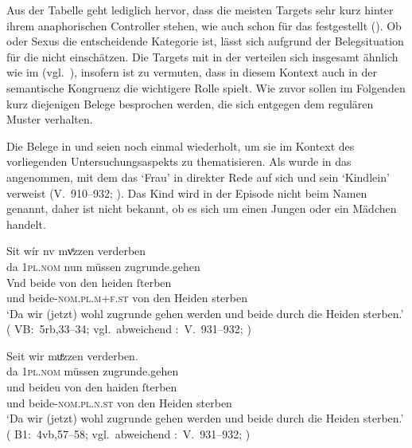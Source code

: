 Aus der Tabelle geht lediglich hervor, dass die meisten Targets sehr kurz
hinter ihrem anaphorischen Controller stehen, wie auch schon für das
\CAO{} festgestellt (). Ob  oder
Sexus die entscheidende Kategorie ist, lässt sich aufgrund der Belegsituation
für die   nicht einschätzen. Die Targets mit
 in der   verteilen sich insgesamt ähnlich wie im
\CAO{} (vgl.~), insofern ist zu vermuten, dass in diesem
Kontext auch in der \KC{} semantische Kongruenz die wichtigere Rolle spielt.
Wie zuvor sollen im Folgenden kurz diejenigen Belege besprochen werden, die
sich entgegen dem regulären Muster verhalten.

Die Belege in  und  seien noch einmal
wiederholt, um sie im Kontext des vorliegenden Unter\-suchungsaspekts zu
thematisieren. Als  wurde in  das
  angenommen, mit dem das  `Frau' in
direkter Rede auf sich und sein  `Kindlein' verweist
(V.~910--932; \cite[98]{schroeder1895}). Das Kind wird in der Episode nicht
beim Namen genannt, daher ist nicht bekannt, ob es sich um einen Jungen oder
ein Mädchen handelt.

\begin{exe}
\ex \label{ex:wipkindelin2}
	\begin{xlist}
	\ex \label{ex:wipkindelin2_1}
		\gll Sit wír nv mvͤzzen verderben \\
			da \textsc{1pl\tsub{\SF/\SX}.nom} nun müssen zugrunde.gehen \\
	\sn \gll Vnd beide von den heiden ſterben \\
			und beide-\textsc{nom.pl.m+f\tsub{\SF/\SX}.st} von den Heiden
				sterben \\
		\trans `Da wir (jetzt) wohl zugrunde gehen werden und beide durch die Heiden sterben.'
			(%
				VB:~5rb,33--34; vgl.~abweichend
				\KC:~V.~931--932;
				\cite[98]{schroeder1895}%
			)
		
	\ex \label{ex:wipkindelin2_2}
		\gll Seit wir muͤzzen verderben. \\
			da \textsc{1pl\tsub{\SF/\SX}.nom} müssen zugrunde.gehen \\
	\sn \gll und beideu von den haiden ſterben \\
			und beide-\textsc{nom.pl.n\tsub{\SF/\SX}.st} von den Heiden
				sterben \\
		\trans `Da wir (jetzt) wohl zugrunde gehen werden und beide durch die Heiden sterben.'
			(%
				B1:~4vb,57--58; vgl.~abweichend
				\KC:~V.~931--932;
				\cite[98]{schroeder1895}%
			)
	\end{xlist}%
\end{exe}

